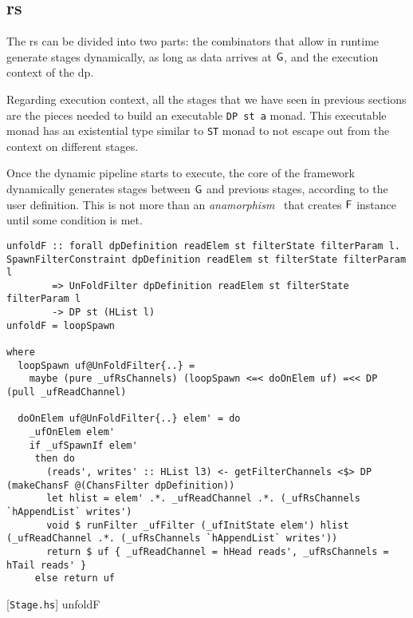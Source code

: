 \subsection{\acrfull{rs}}
The \acrshort{rs} can be divided into two parts: the combinators that allow in runtime generate stages dynamically, as long as data arrives at $\mathsf{G}$,
and the execution context of the \acrshort{dp}.

Regarding execution context, all the stages that we have seen in previous sections are the pieces needed to build an executable \texttt{DP st a} monad.
This executable monad has an existential type similar to \texttt{ST} monad to not escape out from the context on different stages.

Once the dynamic pipeline starts to execute, the core of the framework dynamically generates stages between $\mathsf{G}$ and previous stages, according to the user definition. 
This is not more than an \emph{anamorphism}~\cite{lenses} that creates $\mathsf{F}$ instance until some condition is met.

\begin{listing}[H]
  \begin{verbatim}
unfoldF :: forall dpDefinition readElem st filterState filterParam l. SpawnFilterConstraint dpDefinition readElem st filterState filterParam l
        => UnFoldFilter dpDefinition readElem st filterState filterParam l 
        -> DP st (HList l) 
unfoldF = loopSpawn

where
  loopSpawn uf@UnFoldFilter{..} =
    maybe (pure _ufRsChannels) (loopSpawn <=< doOnElem uf) =<< DP (pull _ufReadChannel)

  doOnElem uf@UnFoldFilter{..} elem' = do
    _ufOnElem elem'
    if _ufSpawnIf elem'
     then do
       (reads', writes' :: HList l3) <- getFilterChannels <$> DP (makeChansF @(ChansFilter dpDefinition))
       let hlist = elem' .*. _ufReadChannel .*. (_ufRsChannels `hAppendList` writes')
       void $ runFilter _ufFilter (_ufInitState elem') hlist (_ufReadChannel .*. (_ufRsChannels `hAppendList` writes'))
       return $ uf { _ufReadChannel = hHead reads', _ufRsChannels = hTail reads' }
     else return uf

  \end{verbatim}
  \caption{[\texttt{Stage.hs}] unfoldF}
  \label{src:dpfh:12}
\end{listing}

